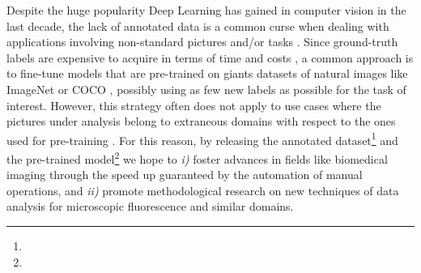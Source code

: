 Despite the huge popularity Deep Learning has gained in computer vision in the last decade, the lack of annotated data is a common curse when dealing with applications involving non-standard pictures and/or tasks \cite{curse_dataset_annotation}. 
Since ground-truth labels are expensive to acquire in terms of time and costs \cite{vija2009annotationcost, mullen2019comparing}, a common approach is to fine-tune models that are pre-trained on giants datasets of natural images like ImageNet \cite{ImageNet} or COCO \cite{COCO}, possibly using as few new labels as possible for the task of interest. 
However, this strategy often does not apply to use cases where the pictures under analysis belong to extraneous domains with respect to the ones used for pre-training \cite{TL_medical_imaging}.
For this reason, by releasing the annotated dataset\footnote{\dataset} and the pre-trained model\footnote{\linkmodel} we hope to \textit{i)} foster advances in fields like biomedical imaging through the speed up guaranteed by the automation of manual operations, and \textit{ii)} promote methodological research on new techniques of data analysis for microscopic fluorescence and similar domains.
